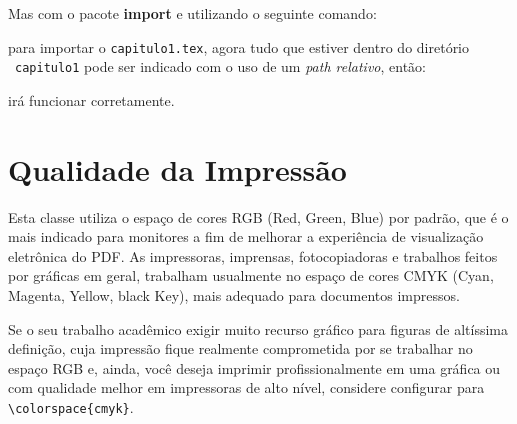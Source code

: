 \begin{center}
\colorbox{black!8}{\hspace{\linewidth}\hspace{-2\fboxsep}}
\end{center}

\noindent
Mas com o pacote \textbf{import} e utilizando o seguinte comando:

\begin{center}
\colorbox{black!8}{\hspace{\linewidth}\hspace{-2\fboxsep}}
\end{center} 

\noindent
 para importar o \texttt{capitulo1.tex}, agora tudo que estiver dentro do diretório \drawtikzfolder\ \texttt{capitulo1} pode ser indicado com o uso de um \emph{path relativo}, então:

\begin{center}
\colorbox{black!8}{\hspace{\linewidth}\hspace{-2\fboxsep}}
\end{center}

\noindent
irá funcionar corretamente.

\section{Qualidade da Impressão}

Esta classe utiliza o espaço de cores RGB (Red, Green, Blue) por padrão, que é o mais indicado para monitores a fim de melhorar a experiência de visualização eletrônica do PDF. As impressoras, imprensas, fotocopiadoras e trabalhos feitos por gráficas em geral, trabalham usualmente no espaço de cores CMYK (Cyan, Magenta, Yellow, black Key), mais adequado para documentos impressos. 

Se o seu trabalho acadêmico exigir muito recurso gráfico para figuras de altíssima definição, cuja impressão fique realmente comprometida por se trabalhar no espaço RGB e, ainda, você deseja imprimir profissionalmente em uma gráfica ou com qualidade melhor em impressoras de alto nível, considere configurar para \Verb+\colorspace{cmyk}+. 

